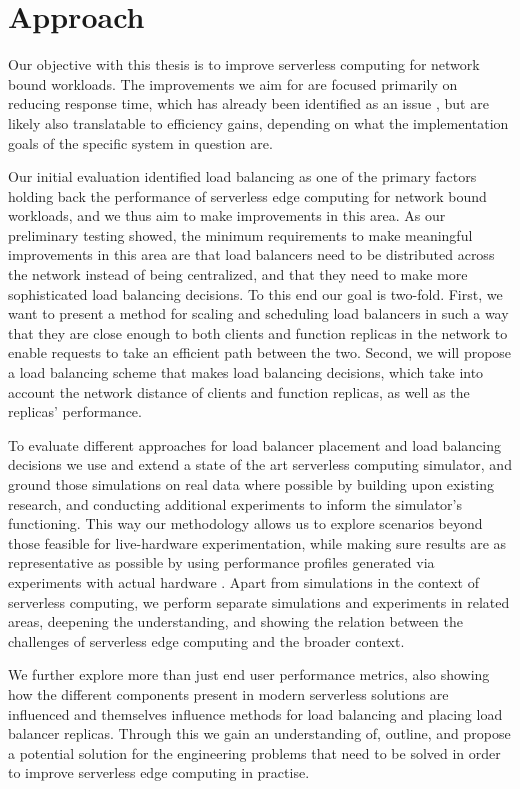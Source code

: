 \section{Approach}
Our objective with this thesis is to improve serverless computing for network bound workloads. 
The improvements we aim for are focused primarily on reducing response time, which has already been identified as an issue \cite{skippy}, but are likely also translatable to efficiency gains, depending on what the implementation goals of the specific system in question are.


Our initial evaluation identified load balancing as one of the primary factors holding back the performance of serverless edge computing for network bound workloads, and we thus aim to make improvements in this area.
As our preliminary testing showed, the minimum requirements to make meaningful improvements in this area are that load balancers need to be distributed across the network  instead of being centralized, and that they need to make more sophisticated load balancing decisions.
To this end our goal is two-fold.
First, we want to present a method for scaling and scheduling load balancers in such a way that they are close enough to both clients and function replicas in the network to enable requests to take an efficient path between the two.
Second, we will propose a load balancing scheme that makes load balancing decisions, which take into account the network distance of clients and function replicas, as well as the replicas' performance.


To evaluate different approaches for load balancer placement and load balancing decisions we use and extend a state of the art serverless computing simulator, and ground those simulations on real data where possible by building upon existing research\cite{philipp-da}, and conducting additional experiments to inform the simulator's functioning.
This way our methodology allows us to explore scenarios beyond those feasible for live-hardware experimentation, while making sure results are as representative as possible by using performance profiles generated via experiments with actual hardware \cite{thomas-thesis}.
Apart from simulations in the context of serverless computing, we perform separate simulations and experiments in related areas, deepening the understanding, and showing the relation between the challenges of serverless edge computing and the broader context.

We further explore more than just end user performance metrics, also showing how the different components present in modern serverless solutions are influenced and themselves influence methods for load balancing and placing load balancer replicas.
Through this we gain an understanding of, outline, and propose a potential solution for the engineering problems that need to be solved in order to improve serverless edge computing in practise.